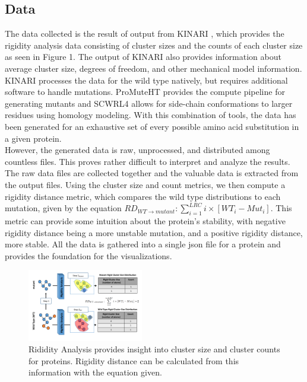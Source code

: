 \documentclass[11pt]{IEEEtran}
\begin{document}
\subsection{Data}\label{AA}
The data collected is the result of output from KINARI \cite{b1}, which provides the rigidity analysis data consisting of cluster sizes and the counts of each cluster size as seen in Figure 1. The output of KINARI also provides information about average cluster size, degrees of freedom, and other mechanical model information. KINARI processes the data for the wild type natively, but requires additional software to handle mutations. ProMuteHT \cite{b5} provides the compute pipeline for generating mutants and SCWRL4 \cite{b6} allows for side-chain conformations to larger residues using homology modeling. With this combination of tools, the data has been generated for an exhaustive set of every possible amino acid substitution in a given protein.\\

However, the generated data is raw, unprocessed, and distributed among countless files. This proves rather difficult to interpret and analyze the results. The raw data files are collected together and the valuable data is extracted from the output files. Using the cluster size and count metrics, we then compute a rigidity distance metric, which compares the wild type distributions to each mutation, given by the equation $RD_{WT \rightarrow mutant} : \sum_{i=1}^{LRC} i \times [WT_i - Mut_i]$. This metric can provide some intuition about the protein's stability, with negative rigidity distance being a more unstable mutation, and a positive rigidity distance, more stable. All the data is gathered into a single json file for a protein and provides the foundation for the visualizations.

\begin{figure}
  \center
  \includegraphics[width=0.45\textwidth]{figs/rigidityCompare.pdf}
  \caption{Rididity Analysis provides insight into cluster size and cluster counts for proteins. Rigidity distance can be calculated from this information with the equation given.}
  \label{fig:rigidityAnalysis}
\end{figure}
\end{document}

